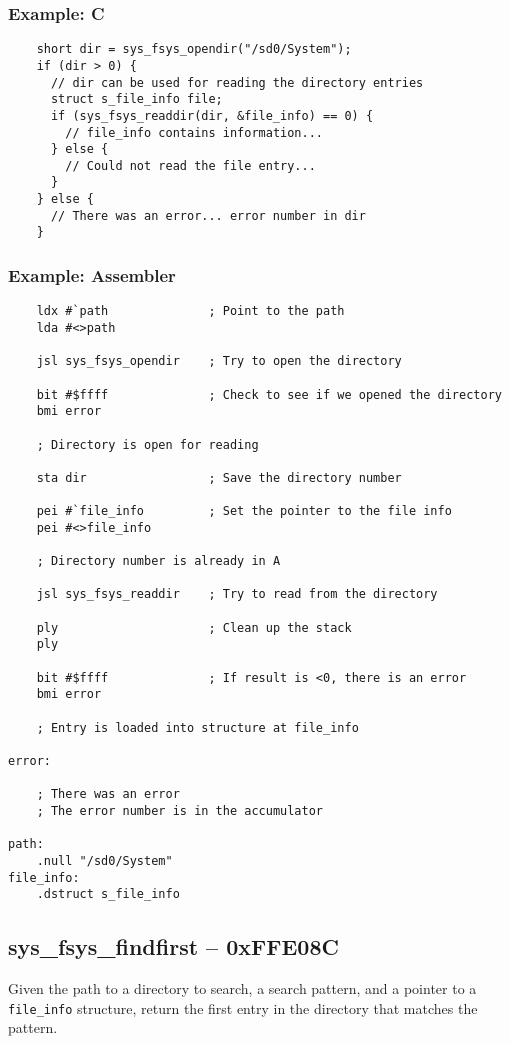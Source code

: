 \subsubsection*{Example: C}
\begin{lstlisting}
    short dir = sys_fsys_opendir("/sd0/System");
    if (dir > 0) {
      // dir can be used for reading the directory entries
      struct s_file_info file;
      if (sys_fsys_readdir(dir, &file_info) == 0) {
        // file_info contains information...
      } else {
        // Could not read the file entry...
      }
    } else {
      // There was an error... error number in dir
    }
\end{lstlisting}

\subsubsection*{Example: Assembler}
\begin{verbatim}
    ldx #`path              ; Point to the path
    lda #<>path

    jsl sys_fsys_opendir    ; Try to open the directory

    bit #$ffff              ; Check to see if we opened the directory
    bmi error

    ; Directory is open for reading

    sta dir                 ; Save the directory number

    pei #`file_info         ; Set the pointer to the file info
    pei #<>file_info

    ; Directory number is already in A

    jsl sys_fsys_readdir    ; Try to read from the directory

    ply                     ; Clean up the stack
    ply

    bit #$ffff              ; If result is <0, there is an error
    bmi error

    ; Entry is loaded into structure at file_info

error:

    ; There was an error
    ; The error number is in the accumulator

path:
    .null "/sd0/System"
file_info:
    .dstruct s_file_info
\end{verbatim}


\subsection*{sys\_fsys\_findfirst -- 0xFFE08C}
Given the path to a directory to search, a search pattern, and a pointer to a \verb+file_info+ structure, return the first entry in the directory that matches the pattern.

